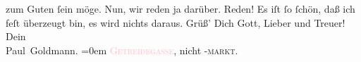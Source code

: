                zum Guten ſein möge. Nun, wir reden ja darüber. Reden! Es iſt ſo ſchön, daß ich feſt
               überzeugt bin, es wird nichts daraus.\pend
           \pstart
           Grüß’ Dich Gott, Lieber und Treuer! {\\[\baselineskip]}Dein {\\[\baselineskip]}\spacefill\mbox{Paul Goldmann.}\pend
           \leftskip=0em{}\pstart
           \noindent{}\textsc{\textcolor{pink}{Getreidegasse}{}\ledrightnote{\textcolor{pink}{Getreidegasse}}}, nicht -\textsc{markt}.\pend
           \endnumbering{}  
      